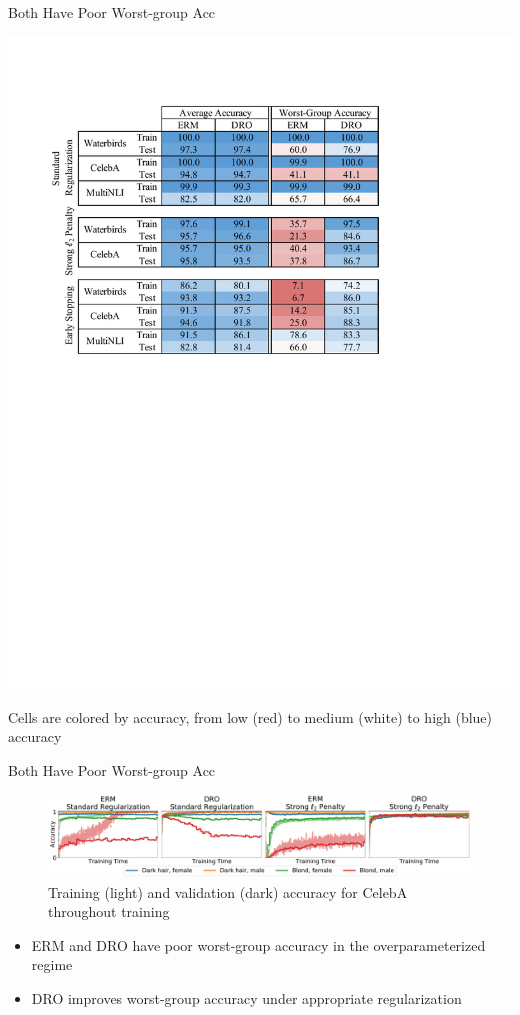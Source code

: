 \documentclass{beamer}
\begin{document}
\begin{viterbiframe}{Both Have Poor Worst-group Acc}

\begin{table}[]
    \centering
    \includegraphics[width=.7\textwidth]{img/table_1.pdf}
    \caption{Cells are colored by accuracy, from low (red) to medium (white) to high (blue) accuracy}
    \label{tab:analysis}
\end{table}


\end{viterbiframe}

\begin{viterbiframe}{Both Have Poor Worst-group Acc}

\begin{figure}
    \centering
    \includegraphics[width=\textwidth]{img/train_curve.pdf}
    \caption{Training (light) and validation (dark) accuracy for CelebA throughout training}
\end{figure}


\begin{itemize}
    \item ERM and DRO have \alert{poor worst-group} accuracy in the overparameterized regime
    
    \item DRO \alert{improves worst-group} accuracy under appropriate regularization
\end{itemize}
\end{viterbiframe}
\end{document}
